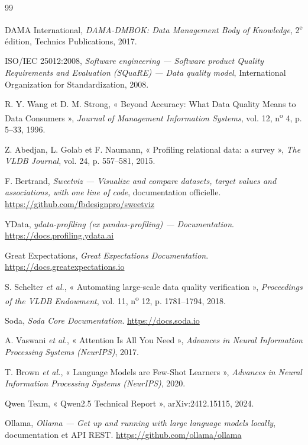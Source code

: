 \cleardoublepage
{}
\begin{thebibliography}{99}

 DAMA International, \textit{DAMA-DMBOK: Data Management Body of Knowledge}, 2\textsuperscript{e} édition, Technics Publications, 2017.

 ISO/IEC 25012:2008, \textit{Software engineering — Software product Quality Requirements and Evaluation (SQuaRE) — Data quality model}, International Organization for Standardization, 2008.

 R. Y. Wang et D. M. Strong, « Beyond Accuracy: What Data Quality Means to Data Consumers », \textit{Journal of Management Information Systems}, vol. 12, n\textsuperscript{o} 4, p. 5--33, 1996.

 Z. Abedjan, L. Golab et F. Naumann, « Profiling relational data: a survey », \textit{The VLDB Journal}, vol. 24, p. 557--581, 2015.

 F. Bertrand, \textit{Sweetviz — Visualize and compare datasets, target values and associations, with one line of code}, documentation officielle. \url{https://github.com/fbdesignpro/sweetviz}

 YData, \textit{ydata-profiling (ex pandas-profiling) — Documentation}. \url{https://docs.profiling.ydata.ai}

 Great Expectations, \textit{Great Expectations Documentation}. \url{https://docs.greatexpectations.io}

 S. Schelter \textit{et al.}, « Automating large-scale data quality verification », \textit{Proceedings of the VLDB Endowment}, vol. 11, n\textsuperscript{o} 12, p. 1781--1794, 2018.

 Soda, \textit{Soda Core Documentation}. \url{https://docs.soda.io}

 A. Vaswani \textit{et al.}, « Attention Is All You Need », \textit{Advances in Neural Information Processing Systems (NeurIPS)}, 2017.

 T. Brown \textit{et al.}, « Language Models are Few-Shot Learners », \textit{Advances in Neural Information Processing Systems (NeurIPS)}, 2020.

 Qwen Team, « Qwen2.5 Technical Report », arXiv:2412.15115, 2024.

 Ollama, \textit{Ollama — Get up and running with large language models locally}, documentation et API REST. \url{https://github.com/ollama/ollama}


\end{thebibliography}
